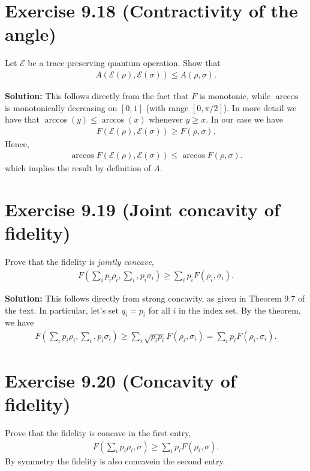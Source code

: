 \documentclass{book}
\newcommand{\mc}[1]{\mathcal{#1}}
\begin{document}
\section*{Exercise 9.18 (Contractivity of the angle)}
    Let $\mc{E}$ be a trace-preserving quantum operation. Show that
    \begin{align}
        A(\mc{E}(\rho), \mc{E}(\sigma)) \leq A(\rho, \sigma).
    \end{align}

    \textbf{Solution:} This follows directly from the fact that $F$ is monotonic, while $\arccos$ is monotonically decreasing on $[0,1]$ (with range $[0,\pi/2]$). In more detail we have that $\arccos(y) \leq \arccos(x)$ whenever $y \geq x$. In our case we have
    \begin{align}
        F(\mc{E}(\rho), \mc{E}(\sigma)) \geq F(\rho, \sigma).
    \end{align}
    Hence,
    \begin{align}
        \arccos F(\mc{E}(\rho), \mc{E}(\sigma)) \leq \arccos F(\rho, \sigma).
    \end{align}
    which implies the result by definition of $A$.

\section*{Exercise 9.19 (Joint concavity of fidelity)}
    Prove that the fidelity is \emph{jointly concave},
    \begin{align}
        F\left(\sum_i p_i \rho_i, \sum_i, p_i \sigma_i \right) \geq \sum_i p_i F(\rho_i, \sigma_i).
    \end{align}

    \textbf{Solution:} This follows directly from strong concavity, as given in Theorem 9.7 of the text. In particular, let's set $q_i = p_i$ for all $i$ in the index set. By the theorem, we have
    \begin{align}
        F\left(\sum_i p_i \rho_i, \sum_i, p_i \sigma_i \right) \geq \sum_i \sqrt{p_i p_i} F(\rho_i, \sigma_i) = \sum_i p_i F(\rho_i, \sigma_i).
    \end{align}

\section*{Exercise 9.20 (Concavity of fidelity)}
    Prove that the fidelity is concave in the first entry,
    \begin{align}
        F\left(\sum_i p_i \rho_i, \sigma\right) \geq \sum_i p_i F(\rho_i, \sigma).
    \end{align}
    By symmetry the fidelity is also concavein the second entry.
\end{document}
